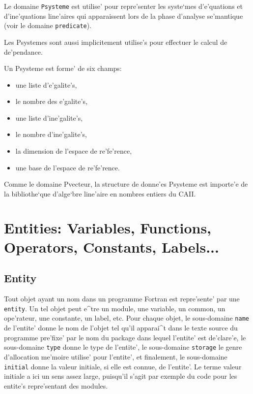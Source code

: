 {
Le domaine {\tt Psysteme} est utilise' pour repre'senter les syste`mes
d'e'quations et d'ine'quations line'aires qui apparaissent lors
de la phase d'analyse se'mantique (voir le domaine {\tt predicate}).

Les Psystemes sont aussi implicitement utilise's pour effectuer le
calcul de de'pendance.

Un Psysteme est forme' de six champs:
\begin{itemize}
  \item une liste d'e'galite's,
  \item le nombre des e'galite's,
  \item une liste d'ine'galite's,
  \item le nombre d'ine'galite's,
  \item la dimension de l'espace de re'fe'rence,
  \item une base de l'espace de re'fe'rence.
\end{itemize}

Comme le domaine Pvecteur, la structure de donne'es Psysteme est
importe'e de la bibliothe`que d'alge`bre line'aire en nombres entiers du
CAII.  }

\section{Entities: Variables, Functions, Operators, Constants, Labels...}
\label{entity}

\subsection{Entity}
\label{subsection-entity}

{
Tout objet ayant un nom dans un programme Fortran est repre'sente' par
une \verb/entity/. Un tel objet peut e^tre un module, une variable, un
common, un ope'rateur, une constante, un label, etc. Pour chaque objet,
le sous-domaine \verb/name/ de l'entite' donne le nom de l'objet tel
qu'il apparai^t dans le texte source du programme pre'fixe' par le nom du
package dans lequel l'entite' est de'clare'e, le sous-domaine
\verb/type/ donne le type de l'entite', le sous-domaine \verb/storage/
le genre d'allocation me'moire utilise' pour l'entite', et finalement,
le sous-domaine \verb/initial/ donne la valeur initiale, si elle est
connue, de l'entite'. Le terme valeur initiale a ici un sens assez
large, puisqu'il s'agit par exemple du code pour les entite's
repre'sentant des modules.
}

